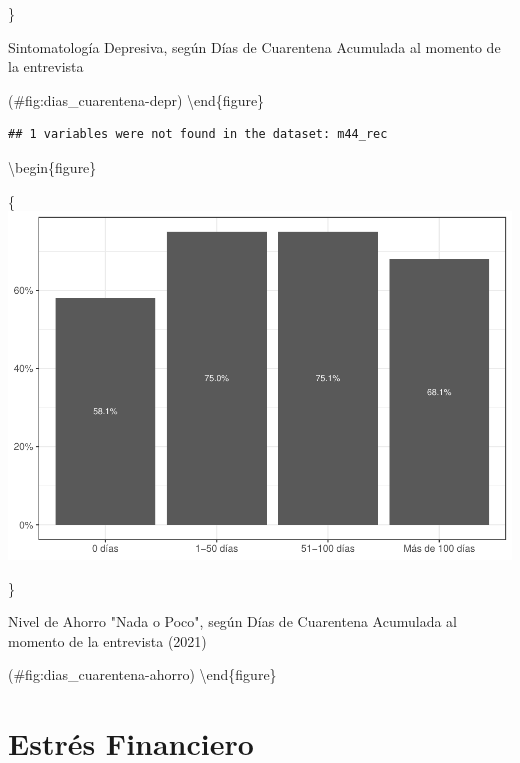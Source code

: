 \documentclass[
  12pt,
]{book}
\begin{document}
\}

\caption{Sintomatología Depresiva, según Días de Cuarentena Acumulada al momento de la entrevista}

(\#fig:dias\_cuarentena-depr)
\textbackslash end\{figure\}

\begin{verbatim}
## 1 variables were not found in the dataset: m44_rec
\end{verbatim}

\textbackslash begin\{figure\}

\{\centering \includegraphics{reporte-elsoc_files/figure-latex/dias_cuarentena-ahorro-1}

\}

\caption{Nivel de Ahorro "Nada o Poco", según Días de Cuarentena Acumulada al momento de la entrevista (2021)}

(\#fig:dias\_cuarentena-ahorro)
\textbackslash end\{figure\}

\hypertarget{estruxe9s-financiero}{%
\section{Estrés Financiero}\label{estruxe9s-financiero}}
\end{document}
